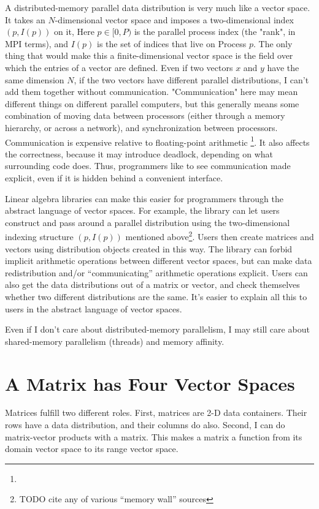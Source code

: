 A distributed-memory parallel data distribution is very much like a vector
space. It takes an $N$-dimensional vector space and imposes a two-dimensional
index $(p,I(p))$ on it, Here $p \in [0,P)$ is the parallel process index (the
"rank", in MPI terms), and $I(p)$ is the set of indices that live on Process
$p$. The only thing that would make this a finite-dimensional vector space is
the field over which the entries of a vector are defined. Even if two vectors
$x$ and $y$ have the same dimension $N$, if the two vectors have different
parallel distributions, I can't add them together without communication.
"Communication" here may mean different things on different parallel computers,
but this generally means some combination of moving data between processors
(either through a memory hierarchy, or across a network), and synchronization
between processors. Communication is expensive relative to floating-point
arithmetic \footnote{}. It also affects the correctness, because it may
introduce deadlock, depending on what surrounding code does. Thus, programmers
like to see communication made explicit, even if it is hidden behind a
convenient interface.


Linear algebra libraries can make this easier for programmers through the
abstract language of vector spaces.  For example, the library can let users
construct and pass around a parallel distribution using the two-dimensional
indexing structure $(p, I(p))$ mentioned above\footnote{ TODO cite any of
various “memory wall” sources}.  Users then create
matrices and vectors using distribution objects created in this way.  The
library can forbid implicit arithmetic operations between different vector
spaces, but can make data redistribution and/or “communicating” arithmetic
operations explicit.  Users can also get the data distributions out of a matrix
or vector, and check themselves whether two different distributions are the
same.  It’s easier to explain all this to users in the abstract language of
vector spaces.

Even if I don’t care about distributed-memory parallelism, I may still care about shared-memory parallelism (threads) and memory affinity.

\section{A Matrix has Four Vector Spaces}

Matrices fulfill two different roles.  First, matrices are 2-D data containers.
Their rows have a data distribution, and their columns do also.  Second, I can
do matrix-vector products with a matrix.  This makes a matrix a function from
its domain vector space to its range vector space.
